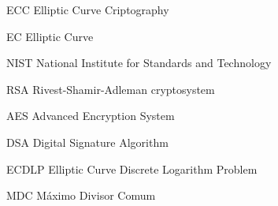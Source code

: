 \begin{siglas}
  \item[ECC] Elliptic Curve Criptography
  \item[EC] Elliptic Curve
  \item[NIST] National Institute for Standards and Technology
  \item[RSA] Rivest-Shamir-Adleman cryptosystem
  \item[AES] Advanced Encryption System
  \item[DSA] Digital Signature Algorithm
  \item[ECDLP] Elliptic Curve Discrete Logarithm Problem
  \item[MDC] Máximo Divisor Comum
\end{siglas}

